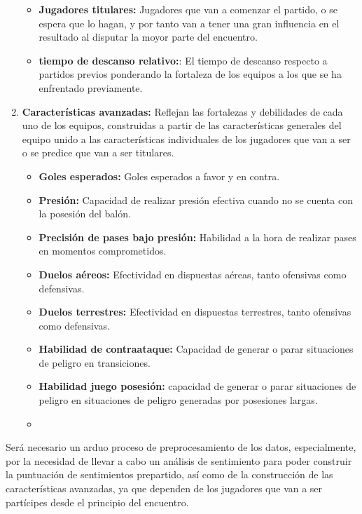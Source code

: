 \begin{enumerate}
\begin{itemize}
        \item \textbf{Jugadores titulares:} Jugadores que van a comenzar el partido, o se espera que lo hagan, y por tanto van a tener una gran influencia en el resultado al disputar la moyor parte del encuentro.
        \item \textbf{tiempo de descanso relativo:}: El tiempo de descanso respecto a partidos previos ponderando la fortaleza de los equipos a los que se ha enfrentado previamente. 
    \end{itemize}
    \item \textbf{Características avanzadas:} Reflejan las fortalezas y debilidades de cada uno de los equipos, construidas a partir de las características generales del equipo unido a las características individuales de los jugadores que van a ser o se predice que van a ser titulares.
    \begin{itemize}
        \item \textbf{Goles esperados:} Goles esperados a favor y en contra.
        \item \textbf{Presión:} Capacidad de realizar presión efectiva cuando no se cuenta con la posesión del balón.
        \item \textbf{Precisión de pases bajo presión:} Habilidad a la hora de realizar pases en momentos comprometidos.
        \item \textbf{Duelos aéreos:} Efectividad en dispuestas aéreas, tanto ofensivas como defensivas.
        \item \textbf{Duelos terrestres:} Efectividad en dispuestas terrestres, tanto ofensivas como defensivas.
        \item \textbf{Habilidad de contraataque:} Capacidad de generar o parar situaciones de peligro en transiciones.
         \item \textbf{Habilidad juego posesión:} capacidad de generar o parar situaciones de peligro en situaciones de peligro generadas por posesiones largas.
        \item 
    \end{itemize}
\end{enumerate}

Será necesario un arduo proceso de preprocesamiento de los datos, especialmente, por la necesidad de llevar a cabo un análisis de sentimiento para poder construir la puntuación de sentimientos prepartido, así como de la construcción de las características avanzadas, ya que dependen de los jugadores que van a ser partícipes desde el principio del encuentro.

